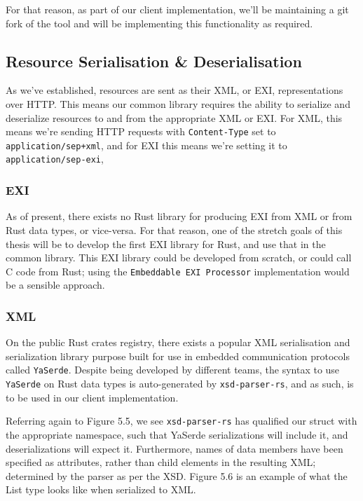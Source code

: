 For that reason, as part of our client implementation, we'll be maintaining a git fork of the tool and will be implementing this functionality as required.


\subsection{Resource Serialisation \& Deserialisation}
As we've established, resources are sent as their XML, or EXI, representations over HTTP. This means our common library requires the ability to serialize and deserialize resources to and from the appropriate XML or EXI.
For XML, this means we're sending HTTP requests with \texttt{Content-Type} set to \texttt{application/sep+xml}, and for EXI this means we're setting it to \texttt{application/sep-exi},

\subsubsection{EXI}
As of present, there exists no Rust library for producing EXI from XML or from Rust data types, or vice-versa. For that reason, one of the stretch goals of this thesis will be to develop the first EXI library for Rust, and use that in the common library.
This EXI library could be developed from scratch, or could call C code from Rust; using the \texttt{Embeddable EXI Processor} implementation would be a sensible approach.

\subsubsection{XML}

On the public Rust crates registry, there exists a popular XML serialisation and serialization library purpose built for use in embedded communication protocols called \texttt{YaSerde}.
Despite being developed by different teams, the syntax to use \texttt{YaSerde} on Rust data types is auto-generated by \texttt{xsd-parser-rs}, and as such, is to be used in our client implementation.

Referring again to Figure 5.5, we see \texttt{xsd-parser-rs} has qualified our struct with the appropriate namespace, such that YaSerde serializations will include it, and deserializations will expect it.
Furthermore, names of data members have been specified as attributes, rather than child elements in the resulting XML; determined by the parser as per the XSD.
Figure 5.6 is an example of what the List type looks like when serialized to XML.

